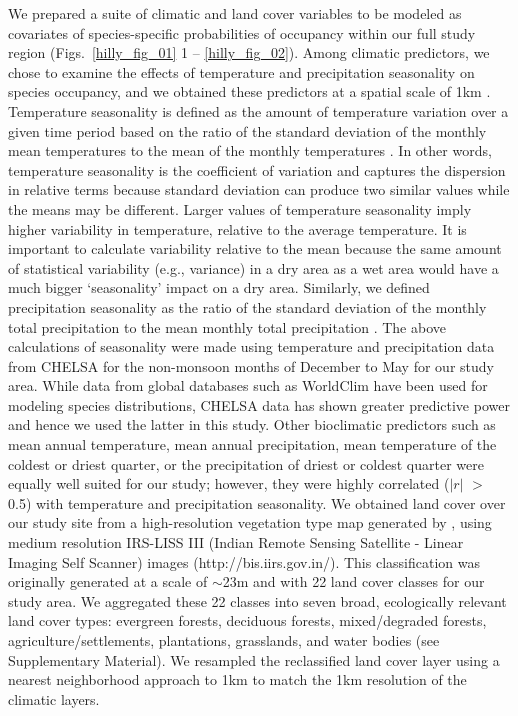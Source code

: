 We prepared a suite of climatic and land cover variables to be modeled as covariates of species-specific probabilities of occupancy within our full study region (Figs.~\ref{hilly_fig_01} 1 -- \ref{hilly_fig_02}).
Among climatic predictors, we chose to examine the effects of temperature and precipitation seasonality on species occupancy, and we obtained these predictors at a spatial scale of 1km \citep[Climatologies at High resolution for the Earth's Land Surface Areas; CHELSA:][]{karger2017}.
Temperature seasonality is defined as the amount of temperature variation over a given time period based on the ratio of the standard deviation of the monthly mean temperatures to the mean of the monthly temperatures \citep{odonnell2012}.
In other words, temperature seasonality is the coefficient of variation and captures the dispersion in relative terms because standard deviation can produce two similar values while the means may be different.
Larger values of temperature seasonality imply higher variability in temperature, relative to the average temperature.
It is important to calculate variability relative to the mean because the same amount of statistical variability (e.g., variance) in a dry area as a wet area would have a much bigger `seasonality' impact on a dry area.
Similarly, we defined precipitation seasonality as the ratio of the standard deviation of the monthly total precipitation to the mean monthly total precipitation \citep{odonnell2012}.
The above calculations of seasonality were made using temperature and precipitation data from CHELSA for the non-monsoon months of December to May for our study area.
While data from global databases such as WorldClim have been used for modeling species distributions, CHELSA data has shown greater predictive power \citep{karger2017} and hence we used the latter in this study.
Other bioclimatic predictors such as mean annual temperature, mean annual precipitation, mean temperature of the coldest or driest quarter, or the precipitation of driest or coldest quarter were equally well suited for our study; however, they were highly correlated ($|r|$ $>$ 0.5) with temperature and precipitation seasonality.
We obtained land cover over our study site from a high-resolution vegetation type map generated by \citep{roy2015}, using medium resolution IRS-LISS III (Indian Remote Sensing Satellite - Linear Imaging Self Scanner) images (http://bis.iirs.gov.in/).
This classification was originally generated at a scale of $\sim$23m and with 22 land cover classes for our study area.
We aggregated these 22 classes into seven broad, ecologically relevant land cover types: evergreen forests, deciduous forests, mixed/degraded forests, agriculture/settlements, plantations, grasslands, and water bodies (see Supplementary Material).
We resampled the reclassified land cover layer using a nearest neighborhood approach to 1km to match the 1km resolution of the climatic layers.

